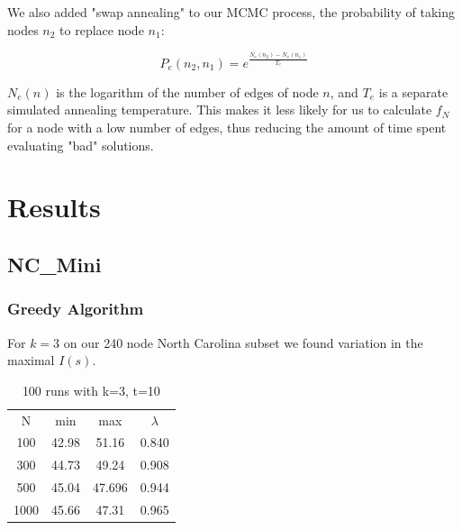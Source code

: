 \documentclass{article}
\begin{document}
	We also added "swap annealing" to our MCMC process, the probability of taking nodes $n_2$ to replace node $n_1$:
	
	\begin{equation}
	\boxed{P_e(n_2,n_1) = e^\frac{N_e(n_2) - N_e(n_1)}{T_e}
	}
	\end{equation}
	
	$N_e(n)$ is the logarithm of the number of edges of node $n$, and $T_e$ is a separate simulated annealing temperature. This makes it less likely for us to calculate $f_N$ for a node with a low number of edges, thus reducing the amount of time spent evaluating "bad" solutions.
	
	\section{Results}
	
	
	\subsection{NC\_Mini}
	
	\subsubsection{Greedy Algorithm}
	
	For $k = 3$ on our 240 node North Carolina subset we found variation in the maximal $I(s)$.
	
	\begin{table}[h!]
		\begin{center}
			\caption{100 runs with k=3, t=10}
			\label{tab:table1}
			\begin{tabular}{|c|c|c|c|} 
				\hline
				N & min & max & $\lambda$\\
				100  & 42.98 & 51.16 & 0.840\\
				300  & 44.73 & 49.24 & 0.908\\
				500  & 45.04 & 47.696 & 0.944\\
				1000 & 45.66 & 47.31 & 0.965\\
				\hline
			\end{tabular}
		\end{center}
	\end{table}
	
\end{document}
